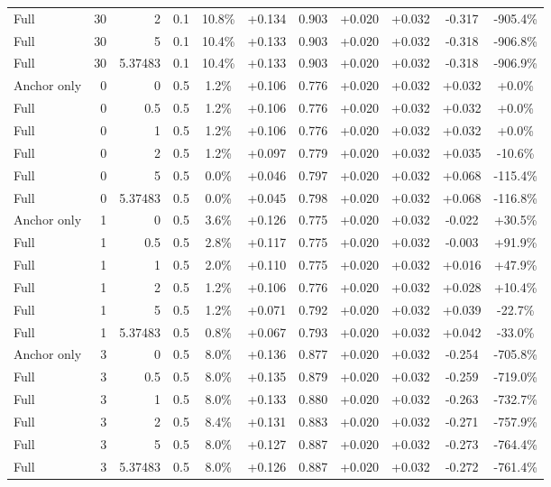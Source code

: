 \begin{table}[htbp]
\begin{tabular}{lrrrccccccc}
Full & 30 & 2 & 0.1 & 10.8\% & +0.134 & 0.903 & +0.020 & +0.032 & -0.317 & -905.4\% \\
Full & 30 & 5 & 0.1 & 10.4\% & +0.133 & 0.903 & +0.020 & +0.032 & -0.318 & -906.8\% \\
Full & 30 & 5.37483 & 0.1 & 10.4\% & +0.133 & 0.903 & +0.020 & +0.032 & -0.318 & -906.9\% \\
Anchor only & 0 & 0 & 0.5 & 1.2\% & +0.106 & 0.776 & +0.020 & +0.032 & +0.032 & +0.0\% \\
Full & 0 & 0.5 & 0.5 & 1.2\% & +0.106 & 0.776 & +0.020 & +0.032 & +0.032 & +0.0\% \\
Full & 0 & 1 & 0.5 & 1.2\% & +0.106 & 0.776 & +0.020 & +0.032 & +0.032 & +0.0\% \\
Full & 0 & 2 & 0.5 & 1.2\% & +0.097 & 0.779 & +0.020 & +0.032 & +0.035 & -10.6\% \\
Full & 0 & 5 & 0.5 & 0.0\% & +0.046 & 0.797 & +0.020 & +0.032 & +0.068 & -115.4\% \\
Full & 0 & 5.37483 & 0.5 & 0.0\% & +0.045 & 0.798 & +0.020 & +0.032 & +0.068 & -116.8\% \\
Anchor only & 1 & 0 & 0.5 & 3.6\% & +0.126 & 0.775 & +0.020 & +0.032 & -0.022 & +30.5\% \\
Full & 1 & 0.5 & 0.5 & 2.8\% & +0.117 & 0.775 & +0.020 & +0.032 & -0.003 & +91.9\% \\
Full & 1 & 1 & 0.5 & 2.0\% & +0.110 & 0.775 & +0.020 & +0.032 & +0.016 & +47.9\% \\
Full & 1 & 2 & 0.5 & 1.2\% & +0.106 & 0.776 & +0.020 & +0.032 & +0.028 & +10.4\% \\
Full & 1 & 5 & 0.5 & 1.2\% & +0.071 & 0.792 & +0.020 & +0.032 & +0.039 & -22.7\% \\
Full & 1 & 5.37483 & 0.5 & 0.8\% & +0.067 & 0.793 & +0.020 & +0.032 & +0.042 & -33.0\% \\
Anchor only & 3 & 0 & 0.5 & 8.0\% & +0.136 & 0.877 & +0.020 & +0.032 & -0.254 & -705.8\% \\
Full & 3 & 0.5 & 0.5 & 8.0\% & +0.135 & 0.879 & +0.020 & +0.032 & -0.259 & -719.0\% \\
Full & 3 & 1 & 0.5 & 8.0\% & +0.133 & 0.880 & +0.020 & +0.032 & -0.263 & -732.7\% \\
Full & 3 & 2 & 0.5 & 8.4\% & +0.131 & 0.883 & +0.020 & +0.032 & -0.271 & -757.9\% \\
Full & 3 & 5 & 0.5 & 8.0\% & +0.127 & 0.887 & +0.020 & +0.032 & -0.273 & -764.4\% \\
Full & 3 & 5.37483 & 0.5 & 8.0\% & +0.126 & 0.887 & +0.020 & +0.032 & -0.272 & -761.4\% \\

\end{tabular}
\end{table}
